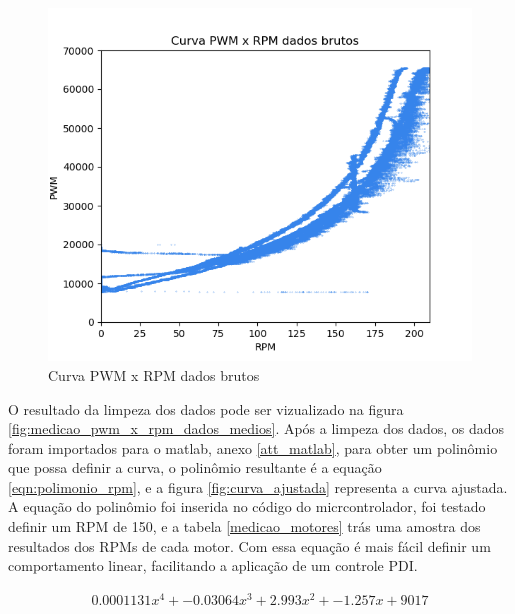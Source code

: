 \begin{figure}[htb]
	\centering
	\includegraphics{figures/curva_pwm_x_rpm_dados_brutos}
	\caption{Curva PWM x RPM dados brutos}
	\label{fig:medicao_pwm_x_rpm_dados_brutos}
\end{figure}


O resultado da limpeza dos dados pode ser vizualizado na figura \ref{fig:medicao_pwm_x_rpm_dados_medios}.
Após a limpeza dos dados, os dados foram importados para o matlab, anexo \ref{att_matlab},
para obter um polinômio que possa definir a curva, o polinômio resultante é a equação \ref{eqn:polimonio_rpm}, e a figura \ref{fig:curva_ajustada} representa a curva ajustada.
A equação do polinômio foi inserida no código do micrcontrolador, foi testado definir um RPM de 150, e a tabela \ref{medicao_motores} trás uma amostra dos resultados dos RPMs de cada motor.
Com essa equação é mais fácil definir um comportamento linear, facilitando a aplicação de um controle PDI.

\begin{equation}
    \begin{split}
        0.0001131x^{4} + -0.03064x^{3} + 2.993x^{2} + -1.257x + 9017
    \end{split}
    \label{eqn:polimonio_rpm}
\end{equation}

